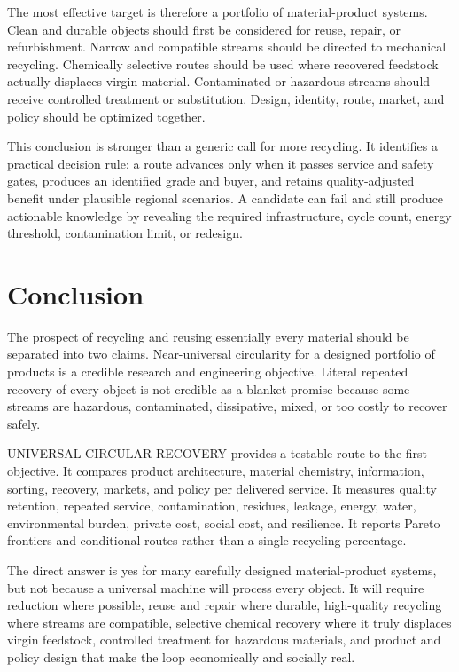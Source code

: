 \documentclass[conference]{IEEEtran}
\begin{document}
The most effective target is therefore a portfolio of material-product systems. Clean and durable objects should first be considered for reuse, repair, or refurbishment. Narrow and compatible streams should be directed to mechanical recycling. Chemically selective routes should be used where recovered feedstock actually displaces virgin material. Contaminated or hazardous streams should receive controlled treatment or substitution. Design, identity, route, market, and policy should be optimized together.

This conclusion is stronger than a generic call for more recycling. It identifies a practical decision rule: a route advances only when it passes service and safety gates, produces an identified grade and buyer, and retains quality-adjusted benefit under plausible regional scenarios. A candidate can fail and still produce actionable knowledge by revealing the required infrastructure, cycle count, energy threshold, contamination limit, or redesign.

\section{Conclusion}

The prospect of recycling and reusing essentially every material should be separated into two claims. Near-universal circularity for a designed portfolio of products is a credible research and engineering objective. Literal repeated recovery of every object is not credible as a blanket promise because some streams are hazardous, contaminated, dissipative, mixed, or too costly to recover safely.

UNIVERSAL-CIRCULAR-RECOVERY provides a testable route to the first objective. It compares product architecture, material chemistry, information, sorting, recovery, markets, and policy per delivered service. It measures quality retention, repeated service, contamination, residues, leakage, energy, water, environmental burden, private cost, social cost, and resilience. It reports Pareto frontiers and conditional routes rather than a single recycling percentage.

The direct answer is yes for many carefully designed material-product systems, but not because a universal machine will process every object. It will require reduction where possible, reuse and repair where durable, high-quality recycling where streams are compatible, selective chemical recovery where it truly displaces virgin feedstock, controlled treatment for hazardous materials, and product and policy design that make the loop economically and socially real.
\end{document}
